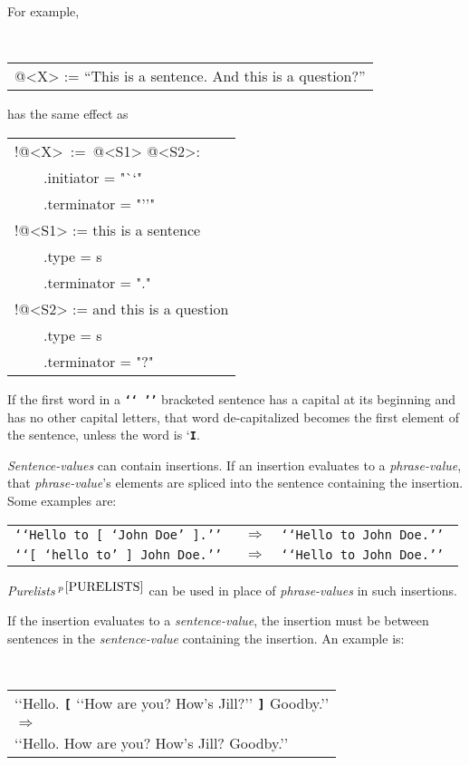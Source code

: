 \documentclass[12pt]{article}
\newcommand{\TT}[1]{{\tt \bfseries #1}}
\newcommand{\pagnote}[1]{$\,^{p\,\pageref{#1}}$}
\newenvironment{indpar}[1][0.3in]%
	{\begin{list}{}%
		     {\setlength{\itemsep}{0in}%
		      \setlength{\topsep}{0in}%
		      \setlength{\parsep}{1ex}%
		      \setlength{\labelwidth}{#1}%
		      \setlength{\leftmargin}{#1}%
		      \addtolength{\leftmargin}{\labelsep}}%
	 \item}%
	{\end{list}}
\begin{document}
For example,
\begin{indpar}
\tt
\begin{tabular}{l}
@<X> := ``This is a sentence.  And this is a question?''
\end{tabular}
\end{indpar}
{\rm has the same effect as}
\begin{indpar}
\begin{tabular}{l}
!@<X>~:=~@<S1> @<S2>: \\
~~~~.initiator = "`{}`" \\
~~~~.terminator = "'{}'" \\
!@<S1> := this is a sentence \\
~~~~.type = s \\
~~~~.terminator = "." \\
!@<S2> := and this is a question \\
~~~~.type = s \\
~~~~.terminator = "?" \\
\end{tabular}
\end{indpar}

If the first word in a \TT{`{}`~'{}'} bracketed sentence has a capital
at its beginning and has no other capital letters, that word de-capitalized
becomes the first element of the sentence, unless the word is `\TT{I}.

{\em Sentence-values} can contain insertions.
If an insertion evaluates to a {\em phrase-value}, that {\em phrase-value}'s
elements are spliced into the sentence containing the insertion.
Some examples are:
\begin{indpar}
\begin{tabular}{rcl}
\tt `{}`Hello to \TT{[} `John Doe' \TT{]}.'{}' & $\Longrightarrow$
                                           & \tt `{}`Hello to John Doe.'{}' \\
\tt `{}`\TT{[} `hello to' \TT{]} John Doe.'{}' & $\Longrightarrow$
                                           & \tt `{}`Hello to John Doe.'{}' \\
\end{tabular}
\end{indpar}
{\em Purelists}\pagnote{PURELISTS}
can be used in place of {\em phrase-values} in such insertions.

If the insertion evaluates to a {\em sentence-value}, the insertion must
be between sentences in the {\em sentence-value} containing the insertion.
An example is:
\begin{indpar}
\tt
\begin{tabular}{l}
`{}`Hello. \TT{[} `{}`How are you?  How's Jill?'{}' \TT{]} Goodby.'{}' \\
$\Longrightarrow$ \\
`{}`Hello. How are you?  How's Jill?  Goodby.'{}' \\
\end{tabular}
\end{indpar}
\end{document}
